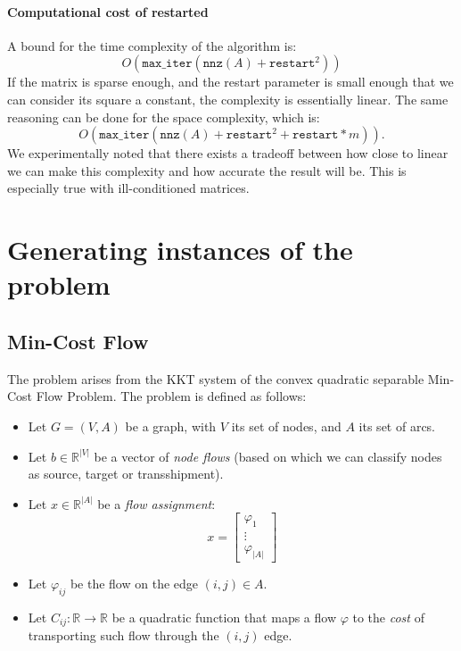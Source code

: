 \documentclass{article}
\newcommand{\reals}{\mathbb R}
\begin{document}
\paragraph{Computational cost of restarted}
A bound for the time complexity of the algorithm is:
\[ O(\texttt{max\_iter} (\texttt{nnz}(A) + \texttt{restart}^2)) \]
If the matrix is sparse enough, and the restart parameter is small enough that we can consider its square a constant, the complexity is essentially linear. The same reasoning can be done for the space complexity, which is:
\[O(\texttt{max\_iter} (\texttt{nnz}(A) + \texttt{restart}^2 + \texttt{restart} * m)).\]
We experimentally noted that there exists a tradeoff between how close to linear we can make this complexity and how accurate the result will be. This is especially true with ill-conditioned matrices.

\section{Generating instances of the problem}

\subsection{Min-Cost Flow}

The problem arises from the KKT system of the convex quadratic separable Min-Cost Flow Problem. The problem is defined as follows:
\begin{itemize}
 \item Let $G = (V, A)$ be a graph, with $V$ its set of nodes, and $A$ its set of arcs.
 \item Let $b \in \mathbb R ^{|V|}$ be a vector of \emph{node flows} (based on which we can classify nodes as source, target or transshipment).
 \item Let $x \in \mathbb R^{|A|}$ be a \emph{flow assignment}:
 \[x = \begin{bmatrix}
    \varphi_1\\
    \vdots\\
    \varphi_{|A|}
   \end{bmatrix}
\]
\item Let $\varphi_{ij}$ be the flow on the edge $(i, j) \in A$.
\item Let $C_{ij} : \reals \to \reals$ be a quadratic function that maps a flow $\varphi$ to the \emph{cost} of transporting such flow through the $(i, j)$ edge.
\end{itemize}
\end{document}

